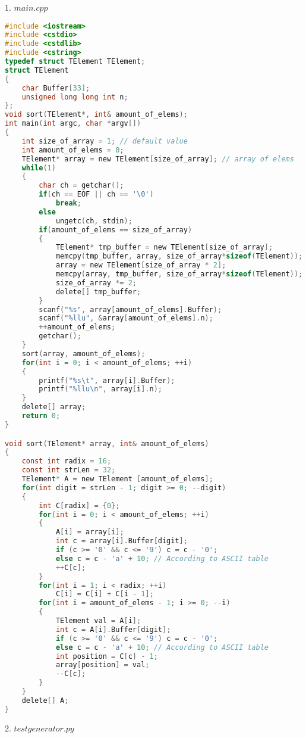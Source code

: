 1. $main.cpp$
\begin{lstlisting}[language=C]
#include <iostream>
#include <cstdio>
#include <cstdlib>
#include <cstring>
typedef struct TElement TElement;
struct TElement
{
    char Buffer[33];
    unsigned long long int n;
};
void sort(TElement*, int& amount_of_elems);
int main(int argc, char *argv[])
{
    int size_of_array = 1; // default value
    int amount_of_elems = 0;
    TElement* array = new TElement[size_of_array]; // array of elems
    while(1)
    {
        char ch = getchar();
        if(ch == EOF || ch == '\0')
            break;
        else
            ungetc(ch, stdin);
        if(amount_of_elems == size_of_array)
        {
            TElement* tmp_buffer = new TElement[size_of_array];
            memcpy(tmp_buffer, array, size_of_array*sizeof(TElement));
            array = new TElement[size_of_array * 2];
            memcpy(array, tmp_buffer, size_of_array*sizeof(TElement));
            size_of_array *= 2;
            delete[] tmp_buffer;
        }
        scanf("%s", array[amount_of_elems].Buffer);
        scanf("%llu", &array[amount_of_elems].n);
        ++amount_of_elems;
        getchar();
    }
    sort(array, amount_of_elems);
    for(int i = 0; i < amount_of_elems; ++i)
    {
        printf("%s\t", array[i].Buffer);
        printf("%llu\n", array[i].n);
    }
    delete[] array;
    return 0;
}

void sort(TElement* array, int& amount_of_elems)
{
    const int radix = 16;
    const int strLen = 32;
    TElement* A = new TElement [amount_of_elems];
    for(int digit = strLen - 1; digit >= 0; --digit)
    {
        int C[radix] = {0};
        for(int i = 0; i < amount_of_elems; ++i)
        {
            A[i] = array[i];
            int c = array[i].Buffer[digit];
            if (c >= '0' && c <= '9') c = c - '0';
            else c = c - 'a' + 10; // According to ASCII table
            ++C[c];
        }
        for(int i = 1; i < radix; ++i)
            C[i] = C[i] + C[i - 1];
        for(int i = amount_of_elems - 1; i >= 0; --i)
        {
            TElement val = A[i];
            int c = A[i].Buffer[digit];
            if (c >= '0' && c <= '9') c = c - '0';
            else c = c - 'a' + 10; // According to ASCII table
            int position = C[c] - 1;
            array[position] = val;
            --C[c];
        }
    }
    delete[] A;
}
\end{lstlisting}

2. $test generator.py$

